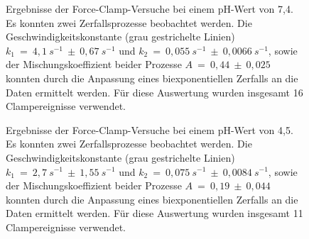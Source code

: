 \begin{figure}[H]
	\centering
	\caption[Ergebnisse der Force-Clamp-Versuche bei einem pH-Wert von 7,4]{Ergebnisse der Force-Clamp-Versuche bei einem pH-Wert von 7,4.  Es konnten zwei Zerfallsprozesse beobachtet werden. Die Geschwindigkeitskonstante (grau gestrichelte Linien) $k_1~=~4,1~s^{-1}~\pm~0,67~s^{-1}$ und $k_2~=~0,055~s^{-1}~\pm~0,0066~s^{-1}$, sowie der Mischungskoeffizient beider Prozesse $A~=~0,44~\pm~0,025$ konnten durch die Anpassung eines biexponentiellen Zerfalls an die Daten ermittelt werden. Für diese Auswertung wurden insgesamt 16 Clampereignisse verwendet.}
	\label{fig:clamp_7_4}
\end{figure}

\begin{figure}[H]
	\centering
	\caption[Ergebnisse der Force-Clamp-Versuche bei einem pH-Wert von 4,5]{Ergebnisse der Force-Clamp-Versuche bei einem pH-Wert von 4,5. Es konnten zwei Zerfallsprozesse beobachtet werden. Die Geschwindigkeitskonstante (grau gestrichelte Linien) $k_1~=~2,7~s^{-1}~\pm~1,55~s^{-1}$ und $k_2~=~0,075~s^{-1}~\pm~0,0084~s^{-1}$, sowie der Mischungskoeffizient beider Prozesse $A~=~0,19~\pm~0,044$ konnten durch die Anpassung eines biexponentiellen Zerfalls an die Daten ermittelt werden. Für diese Auswertung wurden insgesamt 11 Clampereignisse verwendet.}
	\label{fig:clamp_4_5}
\end{figure}

